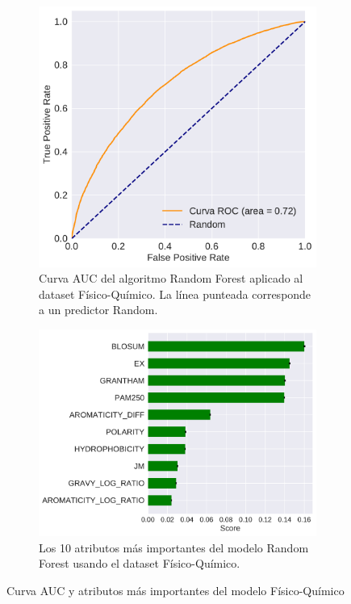 \pagebreak

\begin{figure}[H]
\centering
\begin{subfigure}[b]{0.7\textwidth}
    \centering
    \includegraphics[width=\textwidth]{documents/latex/figures/3/structural/auc_structural.pdf}
    \caption{Curva AUC del algoritmo Random Forest aplicado al dataset Físico-Químico. La línea punteada corresponde a un predictor Random.}
    \label{fig:auc_structural}
\end{subfigure}

\hfill
\hfill

\begin{subfigure}[b]{0.7\textwidth}
    \centering
    \includegraphics[width=\textwidth]{documents/latex/figures/3/structural/importances_structural.pdf}
    \caption{Los 10 atributos más importantes del modelo Random Forest usando el dataset Físico-Químico.}
    \label{fig:importances_structural}
\end{subfigure}

\caption{Curva AUC y atributos más importantes del modelo Físico-Químico}
\end{figure}

